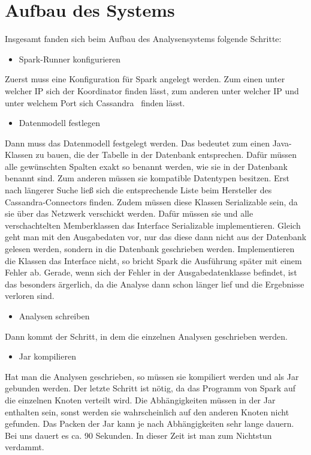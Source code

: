 \section{Aufbau des
Systems}
Insgesamt fanden sich beim Aufbau des Analysensystems folgende Schritte:

\begin{itemize}
\item Spark-Runner konfigurieren
\end{itemize}
Zuerst muss eine Konfiguration für Spark angelegt werden. Zum einen
unter welcher IP sich der Koordinator finden lässt, zum anderen unter
welcher IP und unter welchem Port sich Cassandra \ finden lässt.

\begin{itemize}
\item Datenmodell festlegen
\end{itemize}
Dann muss das Datenmodell festgelegt werden. Das bedeutet zum einen
Java-Klassen zu bauen, die der Tabelle in der Datenbank
entsprechen. Dafür müssen alle gewünschten Spalten exakt so benannt
werden, wie sie in der Datenbank benannt sind. Zum anderen müssen sie
kompatible Datentypen besitzen. Erst nach längerer Suche ließ sich die
entsprechende Liste beim Hersteller des Cassandra-Connectors finden.
Zudem müssen diese Klassen Serializable sein, da sie über das Netzwerk
verschickt werden. Dafür müssen sie und alle verschachtelten
Memberklassen das Interface Serializable implementieren. Gleich geht
man mit den Ausgabedaten vor, nur das diese dann nicht aus der
Datenbank gelesen werden, sondern in die Datenbank geschrieben werden.
Implementieren die Klassen das Interface nicht, so bricht Spark die
Ausführung später mit einem Fehler ab. Gerade, wenn sich der Fehler in
der Ausgabedatenklasse befindet, ist das besonders ärgerlich, da die
Analyse dann schon länger lief und die Ergebnisse verloren sind.

\begin{itemize}
\item Analysen schreiben
\end{itemize}
Dann kommt der Schritt, in dem die einzelnen Analysen geschrieben
werden.

\begin{itemize}
\item Jar kompilieren
\end{itemize}
Hat man die Analysen geschrieben, so müssen sie kompiliert werden und
als Jar gebunden werden. Der letzte Schritt ist nötig, da das Programm
von Spark auf die einzelnen Knoten verteilt wird. Die Abhängigkeiten
müssen in der Jar enthalten sein, sonst werden sie wahrscheinlich auf
den anderen Knoten nicht gefunden. Das Packen der Jar kann je nach
Abhängigkeiten sehr lange dauern. Bei uns dauert es ca. 90 Sekunden. In
dieser Zeit ist man zum Nichtstun verdammt.

